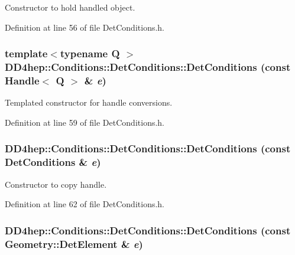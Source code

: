 Constructor to hold handled object. 

Definition at line 56 of file DetConditions.h.\hypertarget{class_d_d4hep_1_1_conditions_1_1_det_conditions_ae5a6ac2c8afa92d6f34a8f2a66138728}{
\subsubsection[{DetConditions}]{\setlength{\rightskip}{0pt plus 5cm}template$<$typename Q $>$ DD4hep::Conditions::DetConditions::DetConditions (const {\bf Handle}$<$ Q $>$ \& {\em e})}}
\label{class_d_d4hep_1_1_conditions_1_1_det_conditions_ae5a6ac2c8afa92d6f34a8f2a66138728}


Templated constructor for handle conversions. 

Definition at line 59 of file DetConditions.h.\hypertarget{class_d_d4hep_1_1_conditions_1_1_det_conditions_a5b72efafc068b87b3ec6eba550353afe}{
\subsubsection[{DetConditions}]{\setlength{\rightskip}{0pt plus 5cm}DD4hep::Conditions::DetConditions::DetConditions (const {\bf DetConditions} \& {\em e})}}
\label{class_d_d4hep_1_1_conditions_1_1_det_conditions_a5b72efafc068b87b3ec6eba550353afe}


Constructor to copy handle. 

Definition at line 62 of file DetConditions.h.\hypertarget{class_d_d4hep_1_1_conditions_1_1_det_conditions_a48f5f45b8d7896721e3875f0b02e0f9a}{
\subsubsection[{DetConditions}]{\setlength{\rightskip}{0pt plus 5cm}DD4hep::Conditions::DetConditions::DetConditions (const {\bf Geometry::DetElement} \& {\em e})}}
\label{class_d_d4hep_1_1_conditions_1_1_det_conditions_a48f5f45b8d7896721e3875f0b02e0f9a}



